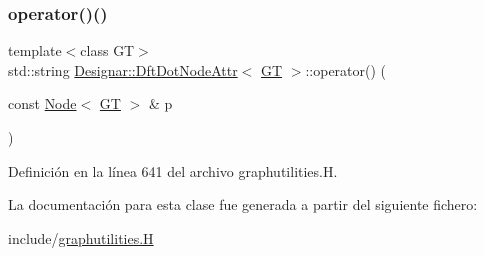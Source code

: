 \subsubsection{\texorpdfstring{operator()()}{operator()()}}
{\footnotesize\ttfamily template$<$class GT$>$ \\
std\+::string \hyperlink{class_designar_1_1_dft_dot_node_attr}{Designar\+::\+Dft\+Dot\+Node\+Attr}$<$ \hyperlink{demo-buildgraph_8_c_a3001c40d2c31ca87ed96cd7d1334a55e}{GT} $>$\+::operator() (\begin{DoxyParamCaption}\item[{const \hyperlink{namespace_designar_a5af326c65aa2bd26b26c410f2030d09e}{Node}$<$ \hyperlink{demo-buildgraph_8_c_a3001c40d2c31ca87ed96cd7d1334a55e}{GT} $>$ \&}]{p }\end{DoxyParamCaption})\hspace{0.3cm}{\ttfamily [inline]}}



Definición en la línea 641 del archivo graphutilities.\+H.



La documentación para esta clase fue generada a partir del siguiente fichero\+:\begin{DoxyCompactItemize}
\item 
include/\hyperlink{graphutilities_8_h}{graphutilities.\+H}\end{DoxyCompactItemize}
